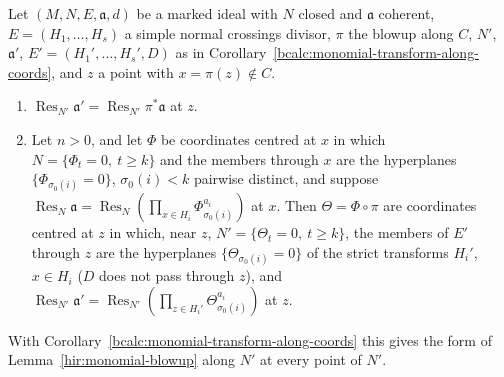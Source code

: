 \begin{lemma}
\label{bcalc:monomial-transform-along-off-centre}
\leanok
Let \((M,N,E,\mathfrak a,d)\) be a marked ideal with \(N\) closed and \(\mathfrak a\) coherent, \(E=(H_1,\dots,H_s)\) a simple normal crossings divisor,
\(\pi\) the blowup along \(C\), \(N'\), \(\mathfrak a'\), \(E'=(H_1',\dots,H_s',D)\) as in Corollary~\ref{bcalc:monomial-transform-along-coords}, and \(z\) a point with
\(x=\pi(z)\notin C\).
\begin{enumerate}
\item \(\operatorname{Res}_{N'}\mathfrak a'=\operatorname{Res}_{N'}\pi^*\mathfrak a\) at \(z\).
\item Let \(n>0\), and let \(\Phi\) be coordinates centred at \(x\) in which \(N=\{\Phi_t=0,\ t\ge k\}\) and the members through \(x\) are the hyperplanes
\(\{\Phi_{\sigma_0(i)}=0\}\), \(\sigma_0(i)<k\) pairwise distinct, and suppose
\(\operatorname{Res}_N\mathfrak a=\operatorname{Res}_N(\prod_{x\in H_i}\Phi_{\sigma_0(i)}^{a_i})\) at \(x\). Then \(\Theta=\Phi\circ\pi\) are coordinates centred at \(z\) in
which, near \(z\), \(N'=\{\Theta_t=0,\ t\ge k\}\), the members of \(E'\) through \(z\) are the hyperplanes \(\{\Theta_{\sigma_0(i)}=0\}\) of the strict
transforms \(H_i'\), \(x\in H_i\) (\(D\) does not pass through \(z\)), and
\(\operatorname{Res}_{N'}\mathfrak a'=\operatorname{Res}_{N'}(\prod_{z\in H_i'}\Theta_{\sigma_0(i)}^{a_i})\) at \(z\).
\end{enumerate}
With Corollary~\ref{bcalc:monomial-transform-along-coords} this gives the form of Lemma~\ref{hir:monomial-blowup} along \(N'\) at every point of \(N'\).
\end{lemma}
